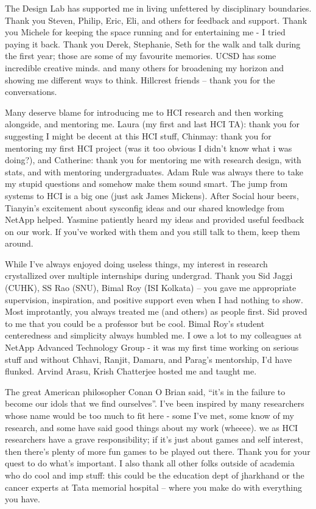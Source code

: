 \begin{frontmatter}
\begin{acknowledgements}
The Design Lab has supported me in living unfettered by disciplinary boundaries. Thank you Steven, Philip, Eric, Eli, and others for feedback and support. Thank you Michele for keeping the space running and for entertaining me - I tried paying it back. Thank you Derek, Stephanie, Seth for the walk and talk during the first year; those are some of my favourite memories. UCSD has some incredible creative minds.  and many others for broadening my horizon and showing me different ways to think.  Hillcrest friends -- thank you for the conversations.

Many deserve blame for introducing me to HCI research and then working alongside, and mentoring me. Laura (my first and last HCI TA): thank you for suggesting I might be decent at this HCI stuff, Chinmay: thank you for mentoring my first HCI project (was it too obvious I didn’t know what i was doing?), and Catherine: thank you for mentoring me with research design, with stats, and with mentoring undergraduates. Adam Rule was always there to take my stupid questions and somehow make them sound smart. The jump from systems to HCI is a big one (just ask James Mickens). After Social hour beers, Tianyin’s excitement about sysconfig ideas and our shared knowledge from NetApp helped. Yasmine patiently heard my ideas and provided useful feedback on our work. If you’ve worked with them and you still talk to them, keep them around. 

While I’ve always enjoyed doing useless things, my interest in research crystallized over multiple internships during undergrad. Thank you Sid Jaggi (CUHK), SS Rao (SNU), Bimal Roy (ISI Kolkata) -- you gave me appropriate supervision, inspiration, and positive support even when I had nothing to show. Most improtantly, you always treated me (and others) as people first. Sid proved to me that you could be a professor but be cool. Bimal Roy’s student centeredness and simplicity always humbled me. I owe a lot to my colleagues at NetApp Advanced Technology Group - it was my first time working on serious stuff and without Chhavi, Ranjit, Damaru, and Parag’s mentorship, I’d have flunked. Arvind Arasu, Krish Chatterjee hosted me and taught me. 

The great American philosopher Conan O Brian said, “it’s in the failure to become our idols that we find ourselves”. I’ve been inspired by many researchers whose name would be too much to fit here - some I’ve met, some know of my research, and some have said good things about my work (wheeee). we as HCI researchers have a grave responsibility; if it’s just about games and self interest, then there’s plenty of more fun games to be played out there. Thank you for your quest to do what’s important. I also thank all other folks outside of academia who do cool and imp stuff: this could be the education dept of jharkhand or the cancer experts at Tata memorial hospital -- where you make do with everything you have. 


\end{acknowledgements}
\end{frontmatter}
